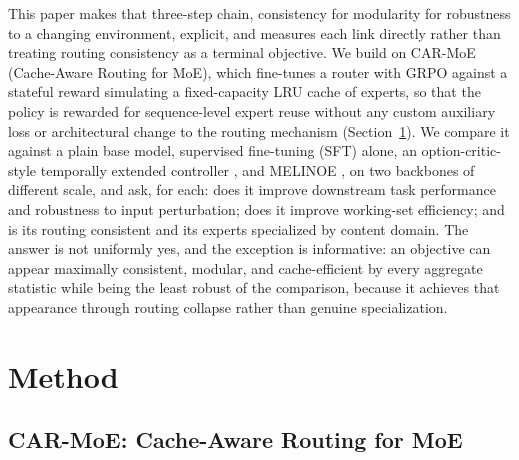 \documentclass{article}
\begin{document}
This paper makes that three-step chain, consistency for modularity for robustness to a
changing environment, explicit, and measures each link directly rather than treating
routing consistency as a terminal objective. We build on CAR-MoE (Cache-Aware Routing for
MoE), which fine-tunes a router with GRPO against a stateful reward simulating a
fixed-capacity LRU cache of experts, so that the policy is rewarded for sequence-level
expert reuse without any custom auxiliary loss or architectural change to the routing
mechanism (Section~\ref{sec:method}). We compare it against a plain base model,
supervised fine-tuning (SFT) alone, an option-critic-style temporally extended controller
\citep{shen2026temporal,bacon2017optioncritic}, and MELINOE \citep{raje2026melinoe}, on
two backbones of different scale, and ask, for each: does it improve downstream task
performance and robustness to input perturbation; does it improve working-set efficiency;
and is its routing consistent and its experts specialized by content domain. The answer
is not uniformly yes, and the exception is informative: an objective can appear maximally
consistent, modular, and cache-efficient by every aggregate statistic while being the
least robust of the comparison, because it achieves that appearance through routing
collapse rather than genuine specialization.

\section{Method}
\label{sec:method}

\subsection{CAR-MoE: Cache-Aware Routing for MoE}
\end{document}
